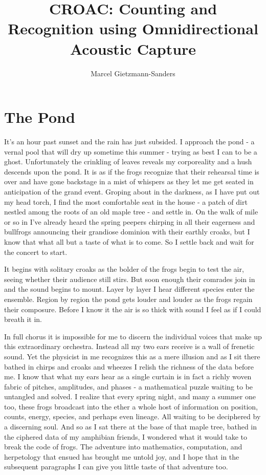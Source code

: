 \documentclass[10pt,a4paper]{article}
\title{CROAC: Counting and Recognition using Omnidirectional Acoustic Capture}
\author{Marcel Gietzmann-Sanders}
\begin{document}
\maketitle
\tableofcontents
\newpage
\section{The Pond}
It's an hour past sunset and the rain has just subsided. I approach the pond - a vernal pool that will dry up sometime this summer - trying as best I can to be a ghost. Unfortunately the crinkling of leaves reveals my corporeality and a hush descends upon the pond. It is as if the frogs recognize that their rehearsal time is over and have gone backstage in a mist of whispers as they let me get seated in anticipation of the grand event. Groping about in the darkness, as I have put out my head torch, I find the most comfortable seat in the house - a patch of dirt nestled among the roots of an old maple tree - and settle in. On the walk of mile or so in I've already heard the spring peepers chirping in all their eagerness and bullfrogs announcing their grandiose dominion with their earthly croaks, but I know that what all but a taste of what is to come. So I settle back  and wait for the concert to start.

It begins with solitary croaks as the bolder of the frogs begin to test the air, seeing whether their audience still stirs. But soon enough their comrades join in and the sound begins to mount. Layer by layer I hear different species enter the ensemble. Region by region the pond gets louder and louder as the frogs regain their composure. Before I know it the air is so thick with sound I feel as if I could breath it in. 

In full chorus it is impossible for me to discern the individual voices that make up this extraordinary orchestra. Instead all my two ears receive is a wall of frenetic sound. Yet the physicist in me recognizes this as a mere illusion and as I sit there bathed in chirps and croaks and wheezes I relish the richness of the data before me. I know that what my ears hear as a single curtain is in fact a richly woven fabric of pitches, amplitudes, and phases - a mathematical puzzle waiting to be untangled and solved. I realize that every spring night, and many a summer one too, these frogs broadcast into the ether a whole host of information on position, counts, energy, species, and perhaps even lineage. All waiting to be deciphered by a discerning soul. And so as I sat there at the base of that maple tree, bathed in the ciphered data of my amphibian friends, I wondered what it would take to break the code of frogs. The adventure into mathematics, computation, and herpetology that ensued has brought me untold joy, and I hope that in the subsequent paragraphs I can give you little taste of that adventure too. 
\newpage
\end{document}
